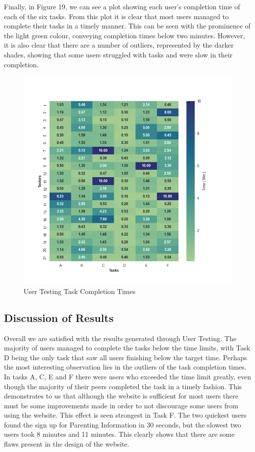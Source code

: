 Finally, in Figure 19, we can see a plot showing each user's completion time of each of the six tasks. From this plot it is clear that most users managed to complete their tasks in a timely manner. This can be seen with the prominence of the light green colour, conveying completion times below two minutes.
However, it is also clear that there are a number of outliers, represented by the darker shades, showing that some users struggled with tasks and were slow in their completion.

\begin{figure}[h]
    \centering
    \includegraphics[scale=0.5]{Resources/Shared/taskstimePlot.png}
    \caption{User Testing Task Completion Times}
\end{figure}

\subsection{Discussion of Results}

Overall we are satisfied with the results generated through User Testing. The majority of users managed to complete the tasks below the time limits, with Task D being the only task that saw all users finishing below the target time.
Perhaps the most interesting observation lies in the outliers of the task completion times. In tasks A, C, E and F there were users who exceeded the time limit greatly, even though the majority of their peers completed the task in a timely fashion. 
This demonstrates to us that although the website is sufficient for most users there must be some improvements made in order to not discourage some users from using the website. 
This effect is seen strongest in Task F. The two quickest users found the sign up for Parenting Information in 30 seconds, but the slowest two users took 8 minutes and 11 minutes. 
This clearly shows that there are some flaws present in the design of the website.  

